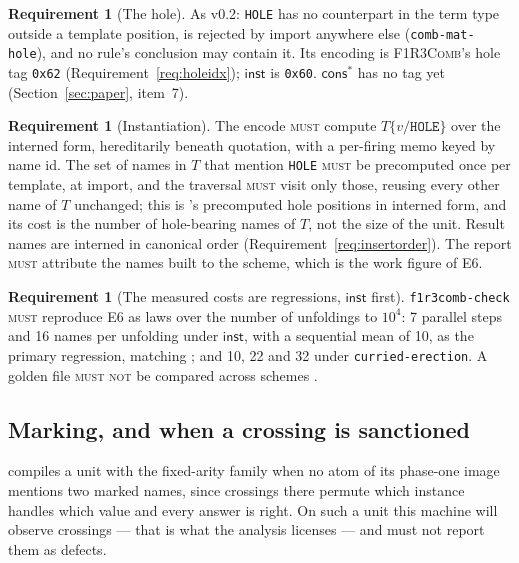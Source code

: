 \documentclass[11pt,a4paper]{article}
\newcommand{\code}[1]{\texttt{#1}}
\newcommand{\Comb}{\textsc{F1R3Comb}}
\newcommand{\MUST}{\textsc{must}}
\newcommand{\MUSTNOT}{\textsc{must not}}
\theoremstyle{definition}
\newtheorem{requirement}[definition]{Requirement}
\theoremstyle{plain}
\newcommand{\inst}{\mathsf{inst}}
\newcommand{\cstar}{\mathsf{cons}^{*}}
\begin{document}
\begin{requirement}[The hole]\label{req:hole}
As v0.2: \code{HOLE} has no counterpart in the term type outside a template
position, is rejected by import anywhere else (\code{comb-mat-hole}), and no
rule's conclusion may contain it. Its encoding is \Comb's hole tag
\code{0x62} (Requirement~\ref{req:holeidx}); $\inst$ is \code{0x60}.
$\cstar$ has no tag yet (Section~\ref{sec:paper}, item~7).
\end{requirement}

\begin{requirement}[Instantiation]\label{req:subst}
The encode \MUST{} compute $T\{v/\code{HOLE}\}$ over the interned form,
hereditarily beneath quotation, with a per-firing memo keyed by name id. The
set of names in $T$ that mention \code{HOLE} \MUST{} be precomputed once per
template, at import, and the traversal \MUST{} visit only those, reusing every
other name of $T$ unchanged; this is \cite[Req.~5.25]{combspec}'s
precomputed hole positions in interned form, and its cost is the number of
hole-bearing names of $T$, not the size of the unit. Result names are interned in
canonical order (Requirement~\ref{req:insertorder}). The report \MUST{}
attribute the names built to the scheme, which is the work figure of E6.
\end{requirement}

\begin{requirement}[The measured costs are regressions, $\inst$ first]
\label{req:dxlaw}
\code{f1r3comb-check} \MUST{} reproduce E6 as laws over the number of
unfoldings to $10^{4}$: 7 parallel steps and 16 names per unfolding under
$\inst$, with a sequential mean of 10, as the primary regression, matching
\cite[Obl.~11.3]{combspec}; and 10, 22 and 32 under \code{curried-erection}. A golden
file \MUSTNOT{} be compared across schemes \cite[Dec.~5.19]{combspec}.
\end{requirement}

\subsection{Marking, and when a crossing is sanctioned}\label{sec:marking}

\cite[Req.~5.17]{combspec} compiles a unit with the fixed-arity family when no
atom of its phase-one image mentions two marked names, since crossings there
permute which instance handles which value and every answer is right. On such
a unit this machine will observe crossings --- that is what the analysis
licenses --- and must not report them as defects.
\end{document}
